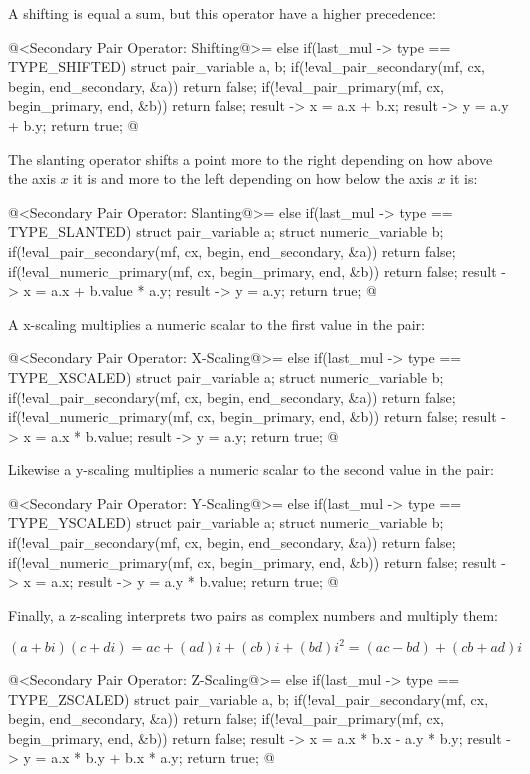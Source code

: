 A shifting is equal a sum, but this operator have a higher precedence:

\iniciocodigo
@<Secondary Pair Operator: Shifting@>=
else if(last_mul -> type == TYPE_SHIFTED){
  struct pair_variable a, b;
  if(!eval_pair_secondary(mf, cx, begin, end_secondary, &a))
    return false;
  if(!eval_pair_primary(mf, cx, begin_primary, end, &b))
    return false;
  result -> x = a.x + b.x;
  result -> y = a.y + b.y;
  return true;
}
@
\fimcodigo

The slanting operator shifts a point more to the right depending on
how above the axis $x$ it is and more to the left depending on how
below the axis $x$ it is:

\iniciocodigo
@<Secondary Pair Operator: Slanting@>=
else if(last_mul -> type == TYPE_SLANTED){
  struct pair_variable a;
  struct numeric_variable b;
  if(!eval_pair_secondary(mf, cx, begin, end_secondary, &a))
    return false;
  if(!eval_numeric_primary(mf, cx, begin_primary, end, &b))
    return false;
  result -> x = a.x + b.value * a.y;
  result -> y = a.y;
  return true;
}
@
\fimcodigo

A x-scaling multiplies a numeric scalar to the first value in the
pair:

\iniciocodigo
@<Secondary Pair Operator: X-Scaling@>=
else if(last_mul -> type == TYPE_XSCALED){
  struct pair_variable a;
  struct numeric_variable b;
  if(!eval_pair_secondary(mf, cx, begin, end_secondary, &a))
    return false;
  if(!eval_numeric_primary(mf, cx, begin_primary, end, &b))
    return false;
  result -> x = a.x * b.value;
  result -> y = a.y;
  return true;
}
@
\fimcodigo

Likewise a y-scaling multiplies a numeric scalar to the second value
in the pair:

\iniciocodigo
@<Secondary Pair Operator: Y-Scaling@>=
else if(last_mul -> type == TYPE_YSCALED){
  struct pair_variable a;
  struct numeric_variable b;
  if(!eval_pair_secondary(mf, cx, begin, end_secondary, &a))
    return false;
  if(!eval_numeric_primary(mf, cx, begin_primary, end, &b))
    return false;
  result -> x = a.x;
  result -> y = a.y * b.value;
  return true;
}
@
\fimcodigo

Finally, a z-scaling interprets two pairs as complex numbers and
multiply them:

$$
(a+bi)(c+di) = ac + (ad)i + (cb)i + (bd)i^2 = (ac - bd) + (cb+ad)i
$$

\iniciocodigo
@<Secondary Pair Operator: Z-Scaling@>=
else if(last_mul -> type == TYPE_ZSCALED){
  struct pair_variable a, b;
  if(!eval_pair_secondary(mf, cx, begin, end_secondary, &a))
    return false;
  if(!eval_pair_primary(mf, cx, begin_primary, end, &b))
    return false;
  result -> x = a.x * b.x - a.y * b.y;
  result -> y = a.x * b.y + b.x * a.y;
  return true;
}
@
\fimcodigo


